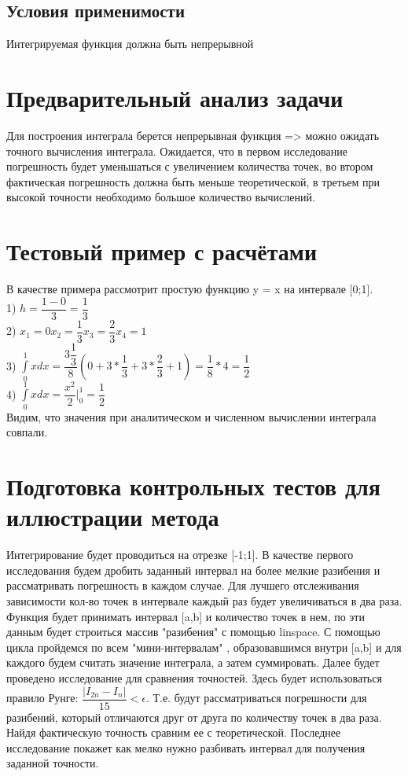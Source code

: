 \documentclass[a4paper]{article}
\begin{document}
\subsection{Условия применимости}
Интегрируемая функция должна быть непрерывной
 
\section{Предварительный анализ задачи} 
Для построения интеграла берется непрерывная функция => можно ожидать точного вычисления интеграла. Ожидается, что в первом исследование погрешность будет уменьшаться с увеличением количества точек, во втором фактическая погрешность должна быть меньше теоретической, в третьем при высокой точности необходимо большое количество вычислений.
\section{Тестовый пример с расчётами} 
В качестве примера рассмотрит простую функцию y = x на интервале [0;1].\\
1) $h = \dfrac{1-0}{3}=\dfrac{1}{3}$ \\
2) $x_1 = 0    x_2 =\dfrac{1}{3} x_3 =\dfrac{2}{3} x_4 = 1  $\\
3) $ \int\limits_0^1 xdx = \dfrac{3 \dfrac{1}{3}}{8}(0+3*\dfrac{1}{3}+3*\dfrac{2}{3}+1) = \dfrac{1}{8}*4=\dfrac{1}{2}$\\
4) $ \int\limits_0^1 xdx  = \dfrac{x^2}{2} |^{1} _{0}=\dfrac{1}{2}$\\
Видим, что значения при аналитическом и численном вычислении интеграла совпали.

 
\section{Подготовка контрольных тестов для иллюстрации метода} 

Интегрирование будет проводиться на отрезке [-1;1]. В качестве первого исследования будем дробить заданный интервал на более мелкие разибения и рассматривать погрешность в каждом случае. Для лучшего отслеживания зависимости кол-во точек в интервале каждый раз будет увеличиваться в два раза. Функция будет принимать интервал [a,b] и количество точек в нем, по эти данным будет строиться массив "разибения" с помощью linspace. С помощью цикла пройдемся по всем "мини-интервалам" , образовавшимся внутри [a,b] и для каждого будем считать значение интеграла, а затем суммировать.  Далее будет проведено исследование для сравнения точностей. Здесь будет использоваться правило Рунге: $\dfrac{|I_{2n}-I_n|}{15}<\epsilon$. Т.е. будут рассматриваться погрешности для разибений, который отличаются друг от друга по количеству точек в два раза. Найдя фактическую точность сравним ее с теоретической. Последнее исследование покажет как мелко нужно разбивать интервал для получения заданной точности.
  
\end{document}
